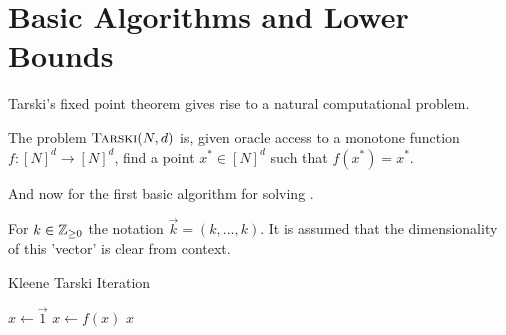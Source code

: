 \section{Basic Algorithms and Lower Bounds}
Tarski's fixed point theorem gives rise to a natural computational problem.
\begin{definition}[$\trsk$]
  The problem $\textsc{Tarski}(N, d)$ is, given oracle access to a monotone function $f : [N]^d \to [N]^d$, find a point $x^* \in [N]^d$ such that $f(x^*) = x^*$.
\end{definition}
And now for the first basic algorithm for solving \trsk.
\begin{notation}
  For $k \in \mathbb{Z}_{\geq 0}$ the notation $\vec{k} = (k, ..., k)$. It is assumed that
  the dimensionality of this 'vector' is clear from context.
\end{notation}
\begin{algorithm}
  \caption{Kleene Tarski Iteration}
  \begin{algorithmic}[1]\label{kleeneTarski}
  \State $x \gets \vec{1}$
    \State $x \gets f(x)$
  \EndWhile
  \Return $x$
  \EndProcedure
  \end{algorithmic}
\end{algorithm}

